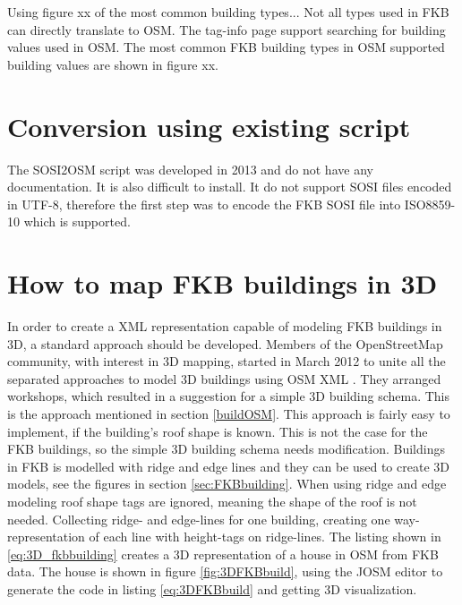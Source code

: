 Using figure xx of the most common building types... Not all types used in FKB can directly translate to OSM. The tag-info page support searching for building values used in OSM. The most common FKB building types in OSM supported building values are shown in figure xx.


\section{Conversion using existing script}

The SOSI2OSM script was developed in 2013 and do not have any documentation. It is also difficult to install. It do not support SOSI files encoded in UTF-8, therefore the first step was to encode the FKB SOSI file into ISO8859-10 which is supported. %



\section{How to map FKB buildings in 3D}
In order to create a XML representation capable of modeling FKB buildings in 3D, a standard approach should be developed. Members of the OpenStreetMap community, with interest in 3D mapping, started in March 2012 to unite all the separated approaches to model 3D buildings using OSM XML \cite{OpenStreetMapm}. They arranged workshops, which resulted in a suggestion for a simple 3D building schema. This is the approach mentioned in section \ref{buildOSM}. This approach is fairly easy to implement, if the building's roof shape is known. This is not the case for the FKB buildings, so the simple 3D building schema needs modification. Buildings in FKB is modelled with ridge and edge lines and they can be used to create 3D models, see the figures in section \ref{sec:FKBbuilding}. When using ridge and edge modeling roof shape tags are ignored, meaning the shape of the roof is not needed. Collecting ridge- and edge-lines for one building, creating one way-representation of each line with height-tags on ridge-lines. The listing shown in \ref{eq:3D_fkbbuilding} creates a 3D representation of a house in OSM from FKB data. The house is shown in figure \ref{fig:3DFKBbuild}, using the JOSM editor to generate the code in listing \ref{eq:3DFKBbuild} and getting 3D visualization.

